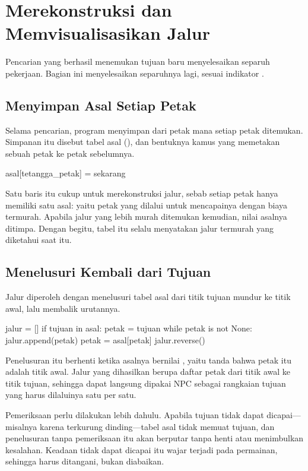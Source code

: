\section{Merekonstruksi dan Memvisualisasikan Jalur}
\label{sec:rekonstruksi}

Pencarian yang berhasil menemukan tujuan baru menyelesaikan separuh pekerjaan.
Bagian ini menyelesaikan separuhnya lagi, sesuai indikator .

\subsection{Menyimpan Asal Setiap Petak}

Selama pencarian, program menyimpan dari petak mana setiap petak ditemukan.
Simpanan itu disebut tabel asal (), dan bentuknya kamus
yang memetakan sebuah petak ke petak sebelumnya.

\begin{kodekeluaran}
asal[tetangga_petak] = sekarang
\end{kodekeluaran}

Satu baris itu cukup untuk merekonstruksi jalur, sebab setiap petak hanya
memiliki satu asal: yaitu petak yang dilalui untuk mencapainya dengan biaya
termurah. Apabila jalur yang lebih murah ditemukan kemudian, nilai asalnya
ditimpa. Dengan begitu, tabel itu selalu menyatakan jalur termurah yang
diketahui saat itu.

\subsection{Menelusuri Kembali dari Tujuan}

Jalur diperoleh dengan menelusuri tabel asal dari titik tujuan mundur ke titik
awal, lalu membalik urutannya.

\begin{kodekeluaran}
jalur = []
if tujuan in asal:
    petak = tujuan
    while petak is not None:
        jalur.append(petak)
        petak = asal[petak]
    jalur.reverse()
\end{kodekeluaran}

Penelusuran itu berhenti ketika asalnya bernilai , yaitu tanda
bahwa petak itu adalah titik awal. Jalur yang dihasilkan
berupa daftar petak dari titik awal ke titik tujuan, sehingga dapat langsung
dipakai NPC sebagai rangkaian tujuan yang harus dilaluinya satu per satu.

\begin{peringatanbox}
Pemeriksaan  perlu dilakukan lebih dahulu. Apabila
tujuan tidak dapat dicapai---misalnya karena terkurung dinding---tabel asal
tidak memuat tujuan, dan penelusuran tanpa pemeriksaan itu akan berputar tanpa
henti atau menimbulkan kesalahan. Keadaan tidak dapat dicapai itu wajar terjadi
pada permainan, sehingga harus ditangani, bukan diabaikan.
\end{peringatanbox}

